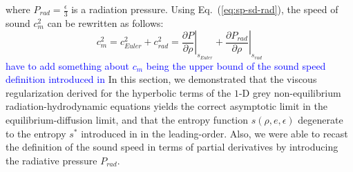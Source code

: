 \documentclass[review]{elsarticle}
\newcommand{\eqt}[1]{Eq.~(\ref{#1})}                     %
\newcommand{\tcb}[1]{\textcolor{blue}{#1}}
\begin{document}
%  
where $P_{rad} = \frac{\epsilon}{3}$ is a radiation pressure. Using \eqt{eq:sp-sd-rad}, the speed of sound $c_m^2$ can be rewritten as follows:
%
\begin{equation}
c_m^2 = c_{Euler}^2 + c_{rad}^2 = \left. \frac{\partial P}{\partial \rho} \right|_{s_{Euler}} + \left. \frac{\partial P_{rad}}{\partial \rho} \right|_{s_{rad}}
\end{equation} 
\tcb{have to add something about $c_m$ being the upper bound of the sound speed definition introduced in \cite{LowrieMorel}}
In this section, we demonstrated that the viscous regularization derived for the hyperbolic terms of the $1$-D grey non-equilibrium radiation-hydrodynamic equations yields the correct asymptotic limit in the equilibrium-diffusion limit, and that the entropy function $s(\rho, e, \epsilon)$ degenerate to the entropy $s^*$ introduced in \cite{LowrieMorel} in the leading-order. Also, we were able to recast the definition of the sound speed in terms of partial derivatives by introducing the radiative pressure $P_{rad}$.
\end{document}
